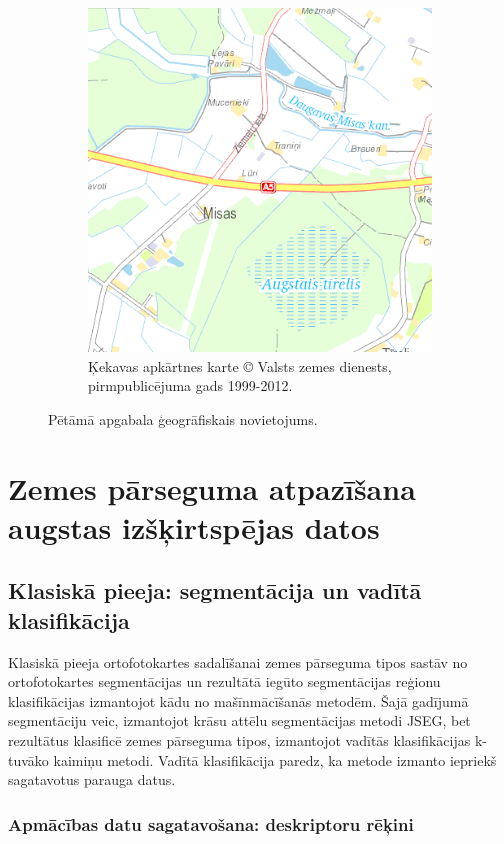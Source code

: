 \documentclass[12pt,paper=a4]{report}
\begin{document}
\begin{figure}[h!]
\begin{subfigure}[b]{.49\linewidth}
\includegraphics[width=\linewidth]{kekavaKarte}
\caption{Ķekavas apkārtnes karte © Valsts zemes dienests, pirmpublicējuma gads 1999-2012.}
\label{fig:kekavaKarte}
\end{subfigure}
\caption{Pētāmā apgabala ģeogrāfiskais novietojums.}
\end{figure}
\chapter{Zemes pārseguma atpazīšana augstas izšķirtspējas datos}
\section{Klasiskā pieeja: segmentācija un vadītā klasifikācija}
Klasiskā pieeja ortofotokartes sadalīšanai zemes pārseguma tipos sastāv no ortofotokartes segmentācijas un rezultātā iegūto segmentācijas reģionu klasifikācijas izmantojot kādu no mašīnmācīšanās metodēm. Šajā gadījumā segmentāciju veic, izmantojot krāsu attēlu segmentācijas metodi JSEG, bet rezultātus klasificē zemes pārseguma tipos, izmantojot vadītās klasifikācijas k-tuvāko kaimiņu metodi. Vadītā klasifikācija paredz, ka metode izmanto iepriekš sagatavotus parauga datus.
\subsection{Apmācības datu sagatavošana: deskriptoru rēķini}
\end{document}
